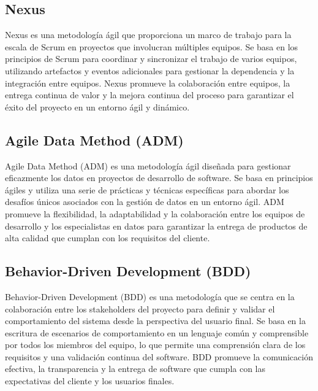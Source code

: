 \subsection{Nexus}
	Nexus es una metodología ágil que proporciona un marco de trabajo para la escala de Scrum en proyectos que involucran múltiples equipos. Se basa en los principios de Scrum para coordinar y sincronizar el trabajo de varios equipos, utilizando artefactos y eventos adicionales para gestionar la dependencia y la integración entre equipos. Nexus promueve la colaboración entre equipos, la entrega continua de valor y la mejora continua del proceso para garantizar el éxito del proyecto en un entorno ágil y dinámico.

\subsection{Agile Data Method (ADM)}
	Agile Data Method (ADM) es una metodología ágil diseñada para gestionar eficazmente los datos en proyectos de desarrollo de software. Se basa en principios ágiles y utiliza una serie de prácticas y técnicas específicas para abordar los desafíos únicos asociados con la gestión de datos en un entorno ágil. ADM promueve la flexibilidad, la adaptabilidad y la colaboración entre los equipos de desarrollo y los especialistas en datos para garantizar la entrega de productos de alta calidad que cumplan con los requisitos del cliente.

\subsection{Behavior-Driven Development (BDD)}
	Behavior-Driven Development (BDD) es una metodología que se centra en la colaboración
	entre los stakeholders del proyecto para definir y validar el comportamiento del sistema desde la perspectiva del usuario final. Se basa en la escritura de escenarios de comportamiento en un lenguaje común y comprensible por todos los miembros del equipo, lo que permite una comprensión clara de los requisitos y una validación continua del software. BDD promueve la comunicación efectiva, la transparencia y la entrega de software que cumpla con las
	expectativas del cliente y los usuarios finales.

